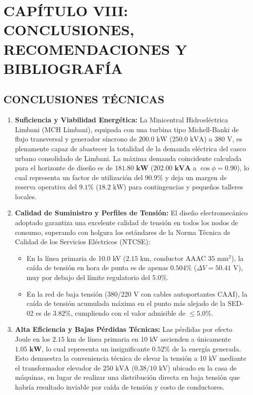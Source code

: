 \chapter*{CAPÍTULO VIII: CONCLUSIONES, RECOMENDACIONES Y BIBLIOGRAFÍA}

\section{CONCLUSIONES TÉCNICAS}

\begin{enumerate}
  \item \textbf{Suficiencia y Viabilidad Energética:} La Minicentral Hidroeléctrica Limbani (MCH Limbani), equipada con una turbina tipo Michell-Banki de flujo transversal y generador síncrono de $200.0\text{ kW}$ ($250.0\text{ kVA}$) a $380\text{ V}$, es plenamente capaz de abastecer la totalidad de la demanda eléctrica del casco urbano consolidado de Limbani. La máxima demanda coincidente calculada para el horizonte de diseño es de $\mathbf{181.80\text{ kW}}$ ($\mathbf{202.00\text{ kVA}}$ a $\cos\phi = 0.90$), lo cual representa un factor de utilización del $\mathbf{90.9\%}$ y deja un margen de reserva operativa del $\mathbf{9.1\%}$ ($18.2\text{ kW}$) para contingencias y pequeños talleres locales.
  \item \textbf{Calidad de Suministro y Perfiles de Tensión:} El diseño electromecánico adoptado garantiza una excelente calidad de tensión en todos los nodos de consumo, superando con holgura los estándares de la Norma Técnica de Calidad de los Servicios Eléctricos (NTCSE):
    \begin{itemize}
      \item En la línea primaria de 10.0 kV ($2.15\text{ km}$, conductor AAAC $35\text{ mm}^2$), la caída de tensión en hora de punta es de apenas $\mathbf{0.504\%}$ ($\Delta V = 50.41\text{ V}$), muy por debajo del límite regulatorio del $5.0\%$.
      \item En la red de baja tensión (380/220 V con cables autoportantes CAAI), la caída de tensión acumulada máxima en el punto más alejado de la SED-02 es de $\mathbf{3.82\%}$, cumpliendo con el valor admisible de $\le 5.0\%$.
    \end{itemize}
  \item \textbf{Alta Eficiencia y Bajas Pérdidas Técnicas:} Las pérdidas por efecto Joule en los $2.15\text{ km}$ de línea primaria en 10 kV ascienden a únicamente $\mathbf{1.05\text{ kW}}$, lo cual representa un insignificante $\mathbf{0.52\%}$ de la energía generada. Esto demuestra la conveniencia técnica de elevar la tensión a 10 kV mediante el transformador elevador de $250\text{ kVA}$ ($0.38/10\text{ kV}$) ubicado en la casa de máquinas, en lugar de realizar una distribución directa en baja tensión que habría resultado inviable por caída de tensión y costo de conductores.

\end{enumerate}
